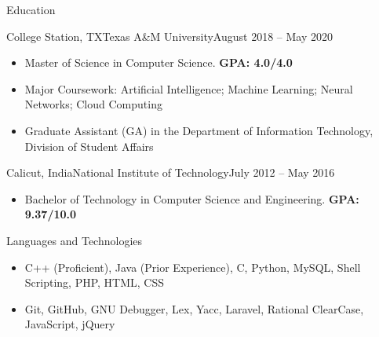 \documentclass[]{mcdowellcv}
\begin{document}
	\makeheader
	
	\begin{cvsection}{Education}
		\begin{cvsubsection}{College Station, TX}{Texas A\&M University}{August 2018 -- May 2020}
			\begin{itemize}
				\item Master of Science in Computer Science. \textbf{GPA: 4.0/4.0}
				\item Major Coursework: Artificial Intelligence; Machine Learning; Neural Networks; Cloud Computing
				\item Graduate Assistant (GA) in the Department of Information Technology, Division of Student Affairs
			\end{itemize}
		\end{cvsubsection}
		
		\begin{cvsubsection}{Calicut, India}{National Institute of Technology}{July 2012 -- May 2016}
			\begin{itemize}
				\item Bachelor of Technology in Computer Science and Engineering. \textbf{GPA: 9.37/10.0}
			\end{itemize}
		\end{cvsubsection}
	\end{cvsection}
	
	\begin{cvsection}{Languages and Technologies}
		\begin{cvsubsection}{}{}{}	
			\begin{itemize}
				\item C++ (Proficient), Java (Prior Experience), C, Python, MySQL, Shell Scripting, PHP, HTML, CSS 
				\item Git, GitHub, GNU Debugger, Lex, Yacc, Laravel, Rational ClearCase, JavaScript, jQuery
			\end{itemize}
		\end{cvsubsection}
	\end{cvsection}
	
\end{document}
